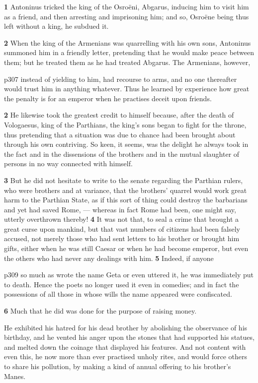 \textbf{1} Antoninus tricked the king of the Osroëni, Abgarus, indu­cing him to visit him as a friend, and then arresting and imprisoning him; and so, Osroëne being thus left without a king, he subdued it.

\textbf{2} When the king of the Armenians was quarrelling with his own sons, Antoninus summoned him in a friendly letter, pretending that he would make peace between them; but he treated them as he had treated Abgarus. The Armenians, however,

p307 instead of yielding to him, had recourse to arms, and no one thereafter would trust him in anything whatever. Thus he learned by experience how great the penalty is for an emperor when he practises deceit upon friends.

\textbf{2} He likewise took the greatest credit to himself because, after the death of Vologaesus, king of the Parthians, the king's sons began to fight for the throne, thus pretending that a situation was due to chance had been brought about through his own contriving. So keen, it seems, was the delight he always took in the fact and in the dissensions of the brothers and in the mutual slaughter of persons in no way connected with himself.

\textbf{3} But he did not hesitate to write to the senate regarding the Parthian rulers, who were brothers and at variance, that the brothers' quarrel would work great harm to the Parthian State, as if this sort of thing could destroy the barbarians and yet had saved Rome, \texthebrew{—} whereas in fact Rome had been, one might say, utterly overthrown thereby! \textbf{4} It was not that, to seal a crime that brought a great curse upon mankind, but that vast numbers of citizens had been falsely accused, not merely those who had sent letters to his brother or brought him gifts, either when he was still Caesar or when he had become emperor, but even the others who had never any dealings with him. \textbf{5} Indeed, if anyone

p309 so much as wrote the name Geta or even uttered it, he was immediately put to death. Hence the poets no longer used it even in comedies; and in fact the possessions of all those in whose wills the name appeared were confiscated.

\textbf{6} Much that he did was done for the purpose of raising money.

He exhibited his hatred for his dead brother by abolishing the observance of his birthday, and he vented his anger upon the stones that had supported his statues, and melted down the coinage that displayed his features. And not content with even this, he now more than ever practised unholy rites, and would force others to share his pollution, by making a kind of annual offering to his brother's Manes.

